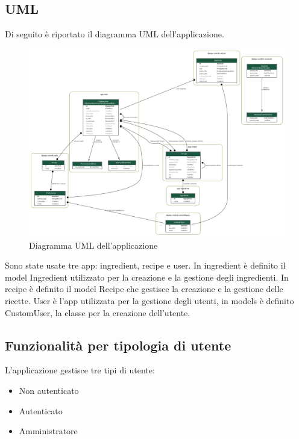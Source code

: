 \documentclass[a4paper]{article}
\begin{document}
        
        \subsection{UML}
            Di seguito è riportato il diagramma UML dell'applicazione.
            
            \begin{figure}[ht]
                \centering
                \includegraphics[width=1\textwidth]{./pictures/uml.png}
                \caption{Diagramma UML dell'applicazione}
                \label{fig:uml}
            \end{figure}
            
            Sono state usate tre app: ingredient, recipe e user.
            In ingredient è definito il model Ingredient utilizzato per la creazione e la gestione degli ingredienti.
            In recipe è definito il model Recipe che gestisce la creazione e la gestione delle ricette.
            User è l'app utilizzata per la gestione degli utenti, in models è definito CustomUser, 
            la classe per la creazione dell'utente.
        
        
        \subsection{Funzionalità per tipologia di utente}
            L'applicazione gestisce tre tipi di utente:
            
            \begin{itemize}
                \item Non autenticato
                \item Autenticato
                \item Amministratore
            \end{itemize}
            
\end{document}
